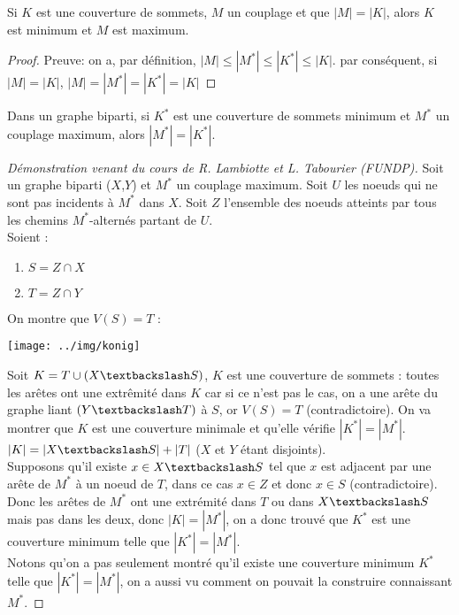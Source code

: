 \begin{mylem}
  Si $K$ est une couverture de sommets, $M$ un couplage et que $|M| = |K|$, alors $K$ est minimum et $M$ est maximum.
  \begin{proof}
     Preuve: on a, par définition, $|M| \leq |M^*| \leq |K^*| \leq |K|$. par conséquent, si $|M| = |K|$, $|M| = |M^*| = |K^*| = |K|$
  \end{proof}
\end{mylem}

\begin{mytheo} [König]
  Dans un graphe biparti, si $K^*$ est une couverture de sommets minimum et $M^*$ un couplage maximum, alors $|M^*| = |K^*|$.
  \begin{proof} [Démonstration venant du cours de R. Lambiotte et L. Tabourier  (FUNDP)]
    Soit un graphe biparti ($X$,$Y$) et $M^*$ un couplage maximum.
    Soit $U$ les noeuds qui ne sont pas incidents à $M^*$ dans $X$.
    Soit $Z$ l'ensemble des noeuds atteints par tous les chemins $M^*$-alternés partant de $U$.\\
    Soient :
    \begin{enumerate}
      \item $S = Z \cap X$
      \item $T = Z \cap Y$
    \end{enumerate}
    On montre que $V(S) = T$ :
    \begin{center}
      \texttt{[image: ../img/konig]}
    \end{center}
    Soit $K = T \cup (X \textbackslash S)$, $K$ est une couverture de sommets : toutes les arêtes ont une extrêmité dans $K$ car si ce n'est pas le cas, on a une arête du graphe liant $(Y \textbackslash T)$ à $S$, or $V(S) = T$ (contradictoire). On va montrer que $K$ est une couverture minimale et qu'elle vérifie $|K^*| = |M^*|$.\\
    $|K| = |X \textbackslash S| + |T|$ ($X$ et $Y$ étant disjoints).\\
    Supposons qu'il existe $x \in X \textbackslash S$ tel que $x$ est adjacent par une arête de $M^*$ à un noeud de $T$, dans ce cas $x \in Z$ et donc $x \in S$ (contradictoire). Donc les arêtes de $M^*$ ont une extrémité dans $T$ ou dans $X \textbackslash S$ mais pas dans les deux, donc $|K| = |M^*|$, on a donc trouvé que $K^*$ est une couverture minimum telle que $|K^*| = |M^*|$.\\
    Notons qu'on a pas seulement montré qu'il existe une couverture minimum $K^*$ telle que $|K^*| = |M^*|$, on a aussi vu comment on pouvait la construire connaissant $M^*$.
  \end{proof}
\end{mytheo}

